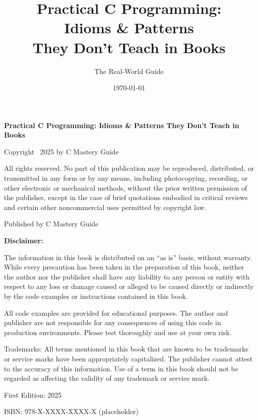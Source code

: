 \documentclass[10pt,openany]{book}
\title{\Huge\bfseries Practical C Programming:\\Idioms \& Patterns\\They Don't Teach in Books}
\author{\Large The Real-World Guide}
\date{\today}
\begin{document}
\frontmatter
\maketitle

\thispagestyle{empty}
\vspace*{\fill}
\begin{center}
\textbf{Practical C Programming: Idioms \& Patterns They Don't Teach in Books}

Copyright \textcopyright\ 2025 by C Mastery Guide

All rights reserved. No part of this publication may be reproduced, distributed, or transmitted in any form or by any means, including photocopying, recording, or other electronic or mechanical methods, without the prior written permission of the publisher, except in the case of brief quotations embodied in critical reviews and certain other noncommercial uses permitted by copyright law.

\vspace{1em}

Published by C Mastery Guide

\vspace{1em}

\textbf{Disclaimer:}

The information in this book is distributed on an ``as is'' basis, without warranty. While every precaution has been taken in the preparation of this book, neither the author nor the publisher shall have any liability to any person or entity with respect to any loss or damage caused or alleged to be caused directly or indirectly by the code examples or instructions contained in this book.

All code examples are provided for educational purposes. The author and publisher are not responsible for any consequences of using this code in production environments. Please test thoroughly and use at your own risk.

\vspace{1em}

Trademarks: All terms mentioned in this book that are known to be trademarks or service marks have been appropriately capitalized. The publisher cannot attest to the accuracy of this information. Use of a term in this book should not be regarded as affecting the validity of any trademark or service mark.

\vspace{1em}

First Edition: 2025

\vspace{1em}

ISBN: 978-X-XXXX-XXXX-X (placeholder)

\end{center}
\vspace*{\fill}
\clearpage
\end{document}
